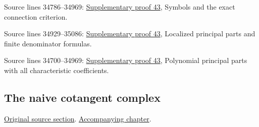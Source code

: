 \begin{AlgebraSourceRoutes}
\item[ALGEBRA-RECON-947] Source lines 34786--34969: \hyperlink{algebra_diff_operators_notes_20260928}{Supplementary proof 43}, Symbols and the exact connection criterion.
\item[ALGEBRA-RECON-948] Source lines 34929--35086: \hyperlink{algebra_diff_operators_notes_20260928}{Supplementary proof 43}, Localized principal parts and finite denominator formulas.
\item[ALGEBRA-RECON-949] Source lines 34700--34969: \hyperlink{algebra_diff_operators_notes_20260928}{Supplementary proof 43}, Polynomial principal parts with all characteristic coefficients.
\end{AlgebraSourceRoutes}

\subsection{The naive cotangent complex}
\hypertarget{algebra-source-section-netherlander}{}
\noindent\href{https://github.com/stacks/stacks-project/blob/a04446e57ec1fbc252a871afcec7752fb2807b14/algebra.tex\#L35116}{Original source section}. \href{algebra.pdf\#nameddest=section-netherlander}{Accompanying chapter}.

